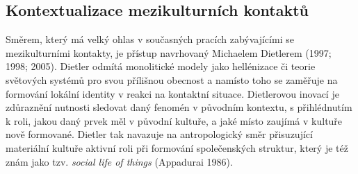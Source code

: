 \subsection[kontextualizace-mezikulturních-kontaktů]{Kontextualizace mezikulturních kontaktů}

Směrem, který má velký ohlas v současných pracích zabývajícími se mezikulturními kontakty, je přístup navrhovaný Michaelem Dietlerem (1997; 1998; 2005). Dietler odmítá monolitické modely jako hellénizace či teorie světových systémů pro svou přílišnou obecnost a namísto toho se zaměřuje na formování lokální identity v reakci na kontaktní situace. Dietlerovou inovací je zdůraznění nutnosti sledovat daný fenomén v původním kontextu, s přihlédnutím k roli, jakou daný prvek měl v původní kultuře, a jaké místo zaujímá v kultuře nově formované. Dietler tak navazuje na antropologický směr přisuzující materiální kultuře aktivní roli při formování společenských struktur, který je též znám jako tzv. {\em social life of things} (Appadurai 1986).


